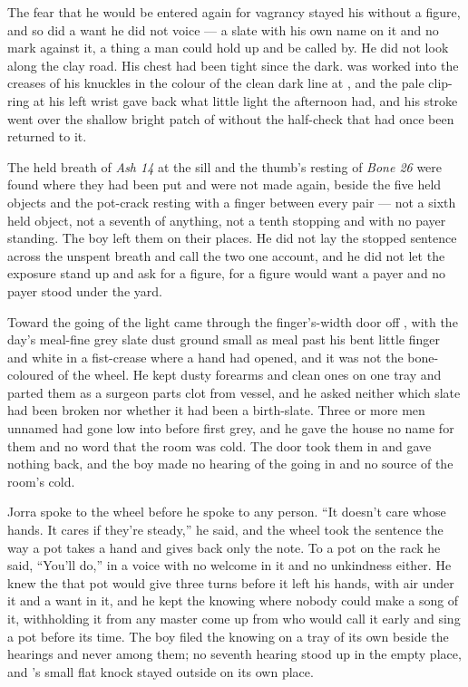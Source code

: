 The fear that he would be entered again for vagrancy stayed his without a figure, and so did a want he did not voice --- a slate with his own name on it and no mark against it, a thing a man could hold up and be called by. He did not look along the clay road. His chest had been tight since the dark.  was worked into the creases of his knuckles in the colour of the clean dark line at , and the pale clip-ring at his left wrist gave back what little light the afternoon had, and his stroke went over the shallow bright patch of  without the half-check that had once been returned to it.

The held breath of \emph{Ash 14} at the sill and the thumb's resting of \emph{Bone 26} were found where they had been put and were not made again, beside the five held objects and the pot-crack resting with a finger between every pair --- not a sixth held object, not a seventh of anything, not a tenth stopping and with no payer standing. The boy left them on their places. He did not lay the stopped sentence across the unspent breath and call the two one account, and he did not let the exposure stand up and ask for a figure, for a figure would want a payer and no payer stood under the yard.

\scenebreak

Toward the going of the light  came through the finger's-width door off , with the day's meal-fine grey slate dust ground small as meal past his bent little finger and white in a fist-crease where a hand had opened, and it was not the bone-coloured  of the wheel. He kept dusty forearms and clean ones on one tray and parted them as a surgeon parts clot from vessel, and he asked neither which slate had been broken nor whether it had been a birth-slate. Three or more men unnamed had gone low into  before first grey, and he gave the house no name for them and no word that the room was cold. The door took them in and gave nothing back, and the boy made no hearing of the going in and no source of the room's cold.

Jorra spoke to the wheel before he spoke to any person. “It doesn't care whose hands. It cares if they're steady,” he said, and the wheel took the sentence the way a pot takes a hand and gives back only the note. To a pot on the rack he said, “You'll do,” in a voice with no welcome in it and no unkindness either. He knew the  that pot would give three turns before it left his hands, with air under it and a want in it, and he kept the knowing where nobody could make a song of it, withholding it from any master come up from  who would call it early and sing a pot before its time. The boy filed the knowing on a tray of its own beside the hearings and never among them; no seventh hearing stood up in the empty place, and 's small flat knock stayed outside on its own place.

